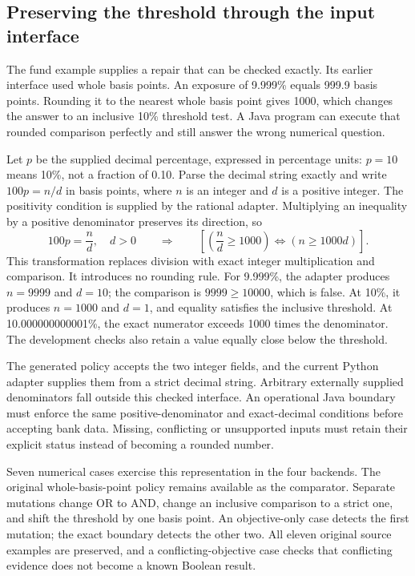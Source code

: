 \documentclass[12pt,a4paper,oneside,openany]{book}
\begin{document}
\subsection{Preserving the threshold through the input interface}

The fund example supplies a repair that can be checked exactly. Its earlier
interface used whole basis points. An exposure of 9.999\% equals 999.9 basis
points. Rounding it to the nearest whole basis point gives 1000, which changes
the answer to an inclusive 10\% threshold test. A Java program can execute that
rounded comparison perfectly and still answer the wrong numerical question.

Let $p$ be the supplied decimal percentage, expressed in percentage units:
$p=10$ means 10\%, not a fraction of 0.10. Parse the decimal string exactly and
write $100p=n/d$ in basis points, where $n$ is an integer and $d$ is a positive
integer. The positivity condition is supplied by the rational adapter. Multiplying
an inequality by a positive denominator preserves its direction, so
\begin{equation}
  100p=\frac{n}{d},\quad d>0
  \qquad\Longrightarrow\qquad
  \left[\left(\frac{n}{d}\geq 1000\right)
  \Longleftrightarrow
  \left(n\geq 1000d\right)\right].
  \label{eq:exact-fractional-exposure}
\end{equation}
This transformation replaces division with exact integer multiplication and
comparison. It introduces no rounding rule. For 9.999\%, the adapter produces
$n=9999$ and $d=10$; the comparison is $9999\geq10000$, which is false. At 10\%,
it produces $n=1000$ and $d=1$, and equality satisfies the inclusive threshold.
At 10.000000000001\%, the exact numerator exceeds 1000 times the denominator.
The development checks also retain a value equally close below the threshold.

The generated policy accepts the two integer fields, and the current Python
adapter supplies them from a strict decimal string. Arbitrary externally
supplied denominators fall outside this checked interface. An operational Java
boundary must enforce the same positive-denominator and exact-decimal conditions
before accepting bank data. Missing, conflicting or unsupported inputs must
retain their explicit status instead of becoming a rounded number.

Seven numerical cases exercise this representation in the four backends. The
original whole-basis-point policy remains available as the comparator. Separate
mutations change OR to AND, change an inclusive comparison to a strict one, and
shift the threshold by one basis point. An objective-only case detects the first
mutation; the exact boundary detects the other two. All eleven original source
examples are preserved, and a conflicting-objective case checks that conflicting
evidence does not become a known Boolean result.
\end{document}
